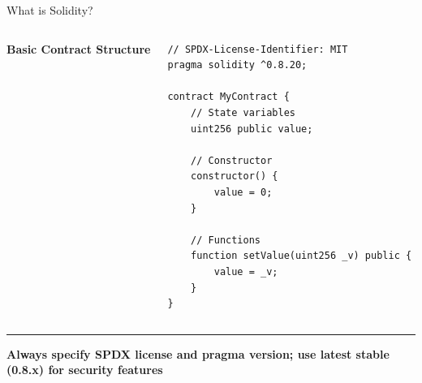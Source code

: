 \documentclass[8pt,aspectratio=169]{beamer}
\newcommand{\bottomnote}[1]{%
\vfill
\vspace{-2mm}
\textcolor{mllavender2}{\rule{\textwidth}{0.4pt}}
\vspace{1mm}
\footnotesize
\textbf{#1}
}
\begin{document}
\begin{frame}[t,fragile]{What is Solidity?}
\begin{columns}[T]
\textbf{Basic Contract Structure}

\begin{lstlisting}
// SPDX-License-Identifier: MIT
pragma solidity ^0.8.20;

contract MyContract {
    // State variables
    uint256 public value;

    // Constructor
    constructor() {
        value = 0;
    }

    // Functions
    function setValue(uint256 _v) public {
        value = _v;
    }
}
\end{lstlisting}
\end{columns}

\bottomnote{Always specify SPDX license and pragma version; use latest stable (0.8.x) for security features}
\end{frame}
\end{document}
